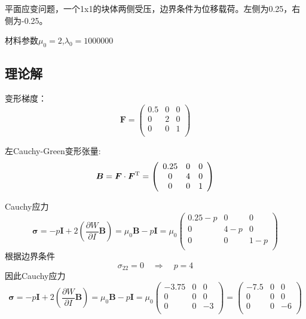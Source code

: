 \documentclass{article}
\begin{document}
平面应变问题，一个1x1的块体两侧受压，边界条件为位移载荷。左侧为0.25，右侧为-0.25。

材料参数$\mu_0=2$,$\lambda_0=1000000$


\subsection{理论解}
变形梯度：
\begin{equation*}
    \bm{F}=\left(
    \begin{array}{ccc}
            0.5 & 0 & 0 \\
            0   & 2 & 0 \\
            0   & 0 & 1 \\
        \end{array}
    \right)
\end{equation*}

左Cauchy-Green变形张量:
\begin{equation*}
    \bm{B}=\bm{F}\cdot\bm{F}^{\rm T}=\left(
    \begin{array}{ccc}
            0.25 & 0 & 0 \\
            0    & 4 & 0 \\
            0    & 0 & 1 \\
        \end{array}
    \right)
\end{equation*}

Cauchy应力
\begin{equation*}
    \bm{\sigma}=-p\bm{I}+2\left(\frac{\partial W}{\partial I}\bm{B}\right)=\mu_0\bm{B}-p\bm{I}=\mu_0\left(
    \begin{array}{ccc}
            0.25-p & 0   & 0   \\
            0      & 4-p & 0   \\
            0      & 0   & 1-p \\
        \end{array}
    \right)
\end{equation*}
根据边界条件
\begin{equation*}
    \sigma_{22}=0 \quad \Rightarrow \quad p=4
\end{equation*}
因此Cauchy应力
\begin{equation*}
    \bm{\sigma}=-p\bm{I}+2\left(\frac{\partial W}{\partial I}\bm{B}\right)=\mu_0\bm{B}-p\bm{I}=\mu_0\left(
    \begin{array}{ccc}
            -3.75 & 0 & 0  \\
            0     & 0 & 0  \\
            0     & 0 & -3 \\
        \end{array}
    \right)
    =\left(
    \begin{array}{ccc}
            -7.5 & 0 & 0  \\
            0    & 0 & 0  \\
            0    & 0 & -6 \\
        \end{array}
    \right)
\end{equation*}
\end{document}
